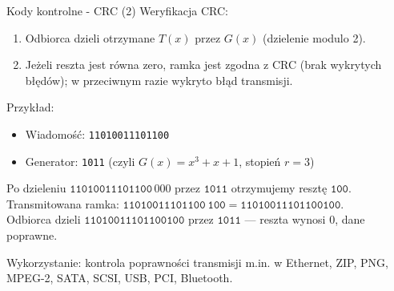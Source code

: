 \documentclass[polish,envcountsect,10pt]{beamer}
\begin{document}
\begin{frame}{Kody kontrolne - CRC (2)}
    Weryfikacja CRC:
    \begin{enumerate}
        \item Odbiorca dzieli otrzymane \(T(x)\) przez \(G(x)\) (dzielenie modulo 2).
        \item Jeżeli reszta jest równa zero, ramka jest zgodna z CRC (brak wykrytych błędów); w przeciwnym razie wykryto błąd transmisji.
    \end{enumerate}
    

    Przykład:
    \begin{itemize}
        \item Wiadomość: \texttt{11010011101100}
        \item Generator: \texttt{1011} (czyli \(G(x)=x^{3}+x+1\), stopień \(r=3\))
    \end{itemize}
    Po dzieleniu \(\texttt{11010011101100}\,000\) przez \(\texttt{1011}\) otrzymujemy resztę \(\texttt{100}\). Transmitowana ramka:
    $
        \texttt{11010011101100}\ \texttt{100} = \texttt{11010011101100100}.
    $
    \\
    Odbiorca dzieli \(\texttt{11010011101100100}\) przez \(\texttt{1011}\) — reszta wynosi $0$, dane poprawne.

    Wykorzystanie: kontrola poprawności transmisji m.in. w Ethernet, ZIP, PNG, MPEG-2, SATA, SCSI, USB, PCI, Bluetooth.
\end{frame}
%
\end{document}
